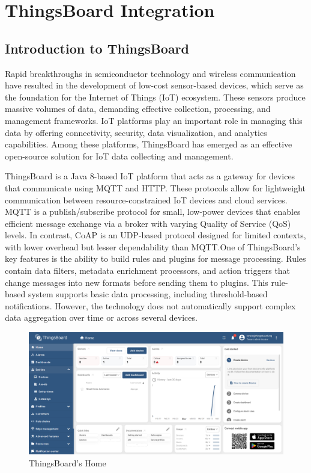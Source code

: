 \documentclass[a4paper,12pt]{report}
\begin{document}
\chapter{ThingsBoard Integration}
\section{Introduction to ThingsBoard}
Rapid breakthroughs in semiconductor technology and wireless communication have resulted in the development of low-cost sensor-based devices, which serve as the foundation for the Internet of Things (IoT) ecosystem.  These sensors produce massive volumes of data, demanding effective collection, processing, and management frameworks.  IoT platforms play an important role in managing this data by offering connectivity, security, data visualization, and analytics capabilities\cite{hammi2018iot}.  Among these platforms, ThingsBoard has emerged as an effective open-source solution for IoT data collecting and management.

ThingsBoard is a Java 8-based IoT platform that acts as a gateway for devices that communicate using MQTT\cite{kegenbekov2022using} and HTTP.  These protocols allow for lightweight communication between resource-constrained IoT devices and cloud services.  MQTT is a publish/subscribe protocol for small, low-power devices that enables efficient message exchange via a broker with varying Quality of Service (QoS) levels\cite{kegenbekov2022using}.  In contrast, CoAP is an UDP-based protocol designed for limited contexts, with lower overhead but lesser dependability than MQTT.One of ThingsBoard's key features is the ability to build rules and plugins for message processing.  Rules contain data filters, metadata enrichment processors, and action triggers that change messages into new formats before sending them to plugins.  This rule-based system supports basic data processing, including threshold-based notifications.  However, the technology does not automatically support complex data aggregation over time or across several devices\cite{hammi2018iot}.


 \begin{figure}[H]
    \centering
    \includegraphics[width=1\textwidth]{home.PNG}
    \caption{ThingsBoard's Home}
 \end{figure}
\end{document}
